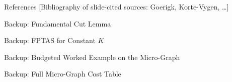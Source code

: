 \documentclass[aspectratio=169,11pt]{beamer}
\begin{document}
\begin{frame}{References}
  \footnotesize
  \textcolor{RWTHOrange}{[Bibliography of slide-cited sources: Goerigk, Korte-Vygen, \ldots]}
\end{frame}

\appendix

\begin{frame}{Backup: Fundamental Cut Lemma}
\end{frame}

\begin{frame}{Backup: FPTAS for Constant $K$}
\end{frame}

\begin{frame}{Backup: Budgeted Worked Example on the Micro-Graph}
\end{frame}

\begin{frame}{Backup: Full Micro-Graph Cost Table}
\end{frame}
\end{document}
